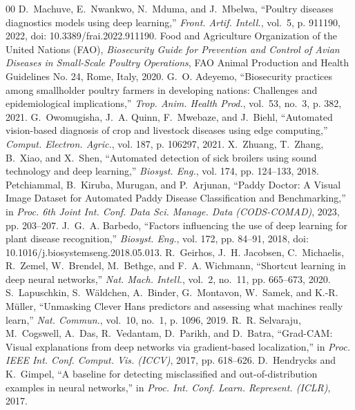 \documentclass[conference]{IEEEtran}
\begin{document}
\begin{thebibliography}{00}\footnotesize\setlength{\itemsep}{0pt}\setlength{\parskip}{0pt}
D.~Machuve, E.~Nwankwo, N.~Mduma, and J.~Mbelwa, ``Poultry diseases diagnostics models using deep learning,'' \emph{Front. Artif. Intell.}, vol.~5, p. 911190, 2022, doi: 10.3389/frai.2022.911190.
Food and Agriculture Organization of the United Nations (FAO), \emph{Biosecurity Guide for Prevention and Control of Avian Diseases in Small-Scale Poultry Operations}, FAO Animal Production and Health Guidelines No. 24, Rome, Italy, 2020.
G.~O. Adeyemo, ``Biosecurity practices among smallholder poultry farmers in developing nations: Challenges and epidemiological implications,'' \emph{Trop. Anim. Health Prod.}, vol.~53, no.~3, p. 382, 2021.
G.~Owomugisha, J.~A. Quinn, F.~Mwebaze, and J.~Biehl, ``Automated vision-based diagnosis of crop and livestock diseases using edge computing,'' \emph{Comput. Electron. Agric.}, vol. 187, p. 106297, 2021.
X.~Zhuang, T.~Zhang, B.~Xiao, and X.~Shen, ``Automated detection of sick broilers using sound technology and deep learning,'' \emph{Biosyst. Eng.}, vol. 174, pp. 124--133, 2018.
Petchiammal, B.~Kiruba, Murugan, and P.~Arjunan, ``Paddy Doctor: A Visual Image Dataset for Automated Paddy Disease Classification and Benchmarking,'' in \emph{Proc. 6th Joint Int. Conf. Data Sci. Manage. Data (CODS-COMAD)}, 2023, pp. 203--207.
J.~G.~A. Barbedo, ``Factors influencing the use of deep learning for plant disease recognition,'' \emph{Biosyst. Eng.}, vol. 172, pp. 84--91, 2018, doi: 10.1016/j.biosystemseng.2018.05.013.
R.~Geirhos, J.~H. Jacobsen, C.~Michaelis, R.~Zemel, W.~Brendel, M.~Bethge, and F.~A. Wichmann, ``Shortcut learning in deep neural networks,'' \emph{Nat. Mach. Intell.}, vol.~2, no.~11, pp. 665--673, 2020.
S.~Lapuschkin, S.~W{\"a}ldchen, A.~Binder, G.~Montavon, W.~Samek, and K.-R. M{\"u}ller, ``Unmasking Clever Hans predictors and assessing what machines really learn,'' \emph{Nat. Commun.}, vol.~10, no.~1, p. 1096, 2019.
R.~R. Selvaraju, M.~Cogswell, A.~Das, R.~Vedantam, D.~Parikh, and D.~Batra, ``Grad-CAM: Visual explanations from deep networks via gradient-based localization,'' in \emph{Proc. IEEE Int. Conf. Comput. Vis. (ICCV)}, 2017, pp. 618--626.
D.~Hendrycks and K.~Gimpel, ``A baseline for detecting misclassified and out-of-distribution examples in neural networks,'' in \emph{Proc. Int. Conf. Learn. Represent. (ICLR)}, 2017.

\end{thebibliography}
\end{document}
